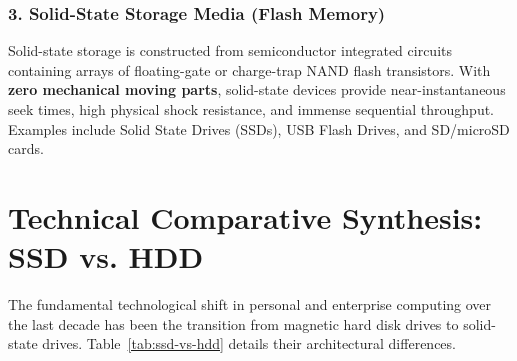 \subsubsection{3. Solid-State Storage Media (Flash Memory)}
Solid-state storage is constructed from semiconductor integrated circuits containing arrays of floating-gate or charge-trap NAND flash transistors. With \textbf{zero mechanical moving parts}, solid-state devices provide near-instantaneous seek times, high physical shock resistance, and immense sequential throughput. Examples include Solid State Drives (SSDs), USB Flash Drives, and SD/microSD cards.

\section{Technical Comparative Synthesis: SSD vs. HDD}

The fundamental technological shift in personal and enterprise computing over the last decade has been the transition from magnetic hard disk drives to solid-state drives. Table~\ref{tab:ssd-vs-hdd} details their architectural differences.

